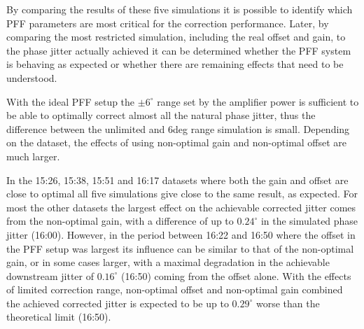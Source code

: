By comparing the results of these five simulations it is possible to identify which PFF parameters are most critical for the correction performance. Later, by comparing the most restricted simulation, including the real offset and gain, to the phase jitter actually achieved it can be determined whether the PFF system is behaving as expected or whether there are remaining effects that need to be understood.

With the ideal PFF setup the \(\pm6^\circ\) range set by the amplifier power is sufficient to be able to optimally correct almost all the natural phase jitter, thus the difference between the unlimited and 6deg range simulation is small. Depending on the dataset, the effects of using non-optimal gain and non-optimal offset are much larger.

%

In the 15:26, 15:38, 15:51 and 16:17 datasets where both the gain and offset are close to optimal all five simulations give close to the same result, as expected. For most the other datasets the largest effect on the achievable corrected jitter comes from the non-optimal gain, with a difference of up to \(0.24^\circ\) in the simulated phase jitter (16:00). However, in the period between 16:22 and 16:50 where the offset in the PFF setup was largest its influence can be similar to that of the non-optimal gain, or in some cases larger, with a maximal degradation in the achievable downstream jitter of \(0.16^\circ\) (16:50) coming from the offset alone. With the effects of limited correction range, non-optimal offset and non-optimal gain combined the achieved corrected jitter is expected to be up to \(0.29^\circ\) worse than the theoretical limit (16:50).%


